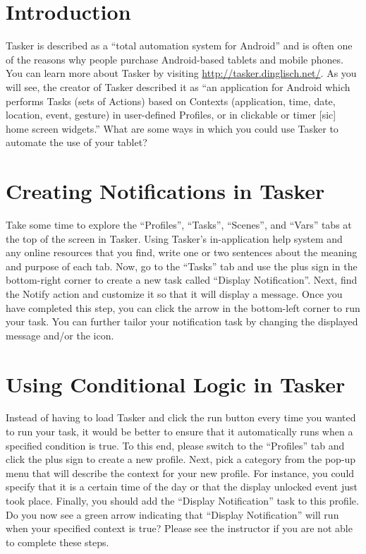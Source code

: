 

\usepackage[compact]{titlesec}



\section*{Introduction}

Tasker is described as a ``total automation system for Android'' and is often one of the reasons why people purchase
Android-based tablets and mobile phones.  You can learn more about Tasker by visiting
\url{http://tasker.dinglisch.net/}. As you will see, the creator of Tasker described it as ``an application for Android
which performs Tasks (sets of Actions) based on Contexts (application, time, date, location, event, gesture) in
user-defined Profiles, or in clickable or timer [sic] home screen widgets.''  What are some ways in which you could use
Tasker to automate the use of your tablet?

\section*{Creating Notifications in Tasker}

Take some time to explore the ``Profiles'', ``Tasks'', ``Scenes'', and ``Vars'' tabs at the top of the screen in Tasker.
Using Tasker's in-application help system and any online resources that you find, write one or two sentences about the
meaning and purpose of each tab. Now, go to the ``Tasks'' tab and use the plus sign in the bottom-right corner to create
a new task called ``Display Notification''.  Next, find the Notify action and customize it so that it will display a
message.  Once you have completed this step, you can click the arrow in the bottom-left corner to run your task. You can
further tailor your notification task by changing the displayed message and/or the icon. 

\section*{Using Conditional Logic in Tasker}

Instead of having to load Tasker and click the run button every time you wanted to run your task, it would be better to
ensure that it automatically runs when a specified condition is true. To this end, please switch to the ``Profiles'' tab
and click the plus sign to create a new profile.  Next, pick a category from the pop-up menu that will describe the
context for your new profile.  For instance, you could specify that it is a certain time of the day or that the display
unlocked event just took place. Finally, you should add the ``Display Notification'' task to this profile.  Do you now
see a green arrow indicating that ``Display Notification'' will run when your specified context is true?  Please see the
instructor if you are not able to complete these steps.


